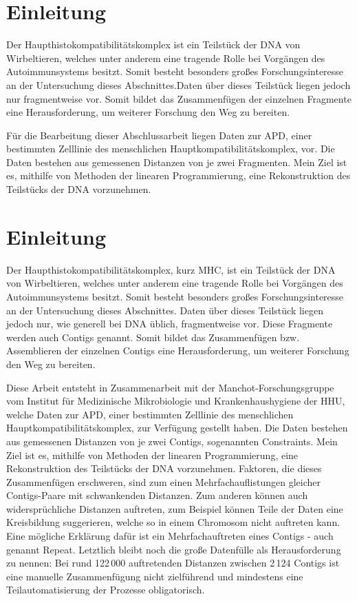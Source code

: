 \section{Einleitung} \raggedbottom 
Der Haupthistokompatibilitätskomplex ist ein Teilstück der DNA von Wirbeltieren, welches unter anderem eine tragende Rolle bei Vorgängen des Autoimmunsystems besitzt. Somit besteht besonders großes Forschungsinteresse an der Untersuchung dieses Abschnittes.Daten über dieses Teilstück liegen jedoch nur fragmentweise vor. Somit bildet das Zusammenfügen der einzelnen Fragmente eine Herausforderung, um weiterer Forschung den Weg zu bereiten.

Für die Bearbeitung dieser Abschlussarbeit liegen Daten zur APD, einer bestimmten Zelllinie des menschlichen Hauptkompatibilitätskomplex, vor.  Die Daten bestehen aus gemessenen Distanzen von je zwei Fragmenten.
Mein Ziel ist es, mithilfe von Methoden der linearen Programmierung, eine Rekonstruktion des Teilstücks der DNA vorzunehmen.\\


\section{Einleitung} \raggedbottom 

Der Haupthistokompatibilitätskomplex, kurz MHC, ist ein Teilstück der DNA von Wirbeltieren, welches unter anderem eine tragende Rolle bei Vorgängen des Autoimmunsystems besitzt. Somit besteht besonders großes Forschungsinteresse an der Untersuchung dieses Abschnittes. Daten über dieses Teilstück liegen jedoch nur, wie generell bei DNA üblich, fragmentweise vor. Diese Fragmente werden auch Contigs genannt. Somit bildet das Zusammenfügen bzw. Assemblieren der einzelnen Contigs eine Herausforderung, um weiterer Forschung den Weg zu bereiten. 

Diese Arbeit entsteht in Zusammenarbeit mit der Manchot-Forschungsgruppe vom Institut für Medizinische Mikrobiologie und Krankenhaushygiene der HHU, welche Daten zur APD, einer bestimmten Zelllinie des menschlichen Hauptkompatibilitätskomplex, zur Verfügung gestellt haben. 
Die Daten bestehen aus gemessenen Distanzen von je zwei Contigs, sogenannten Constraints. 
Mein Ziel ist es, mithilfe von Methoden der linearen Programmierung, eine Rekonstruktion des Teilstücks der DNA vorzunehmen. Faktoren, die dieses Zusammenfügen erschweren, sind zum einen Mehrfachauflistungen gleicher Contigs-Paare mit schwankenden Distanzen. Zum anderen können auch widersprüchliche Distanzen auftreten, zum Beispiel können Teile der Daten eine Kreisbildung suggerieren, welche so in einem Chromosom nicht auftreten kann. Eine mögliche Erklärung dafür ist ein Mehrfachauftreten eines Contigs - auch genannt Repeat. Letztlich bleibt noch die große Datenfülle als Herausforderung zu nennen: Bei rund 122\,000 auftretenden Distanzen zwischen 2\,124 Contigs ist eine manuelle Zusammenfügung nicht zielführend und mindestens eine Teilautomatisierung der Prozesse obligatorisch.

